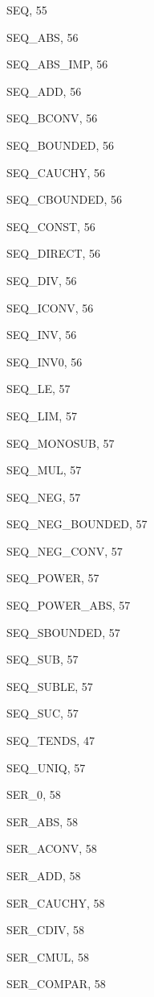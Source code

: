 \begin{theindex}
  \indexspace

  \item {\ptt SEQ}, 55
  \item {\ptt SEQ\_ABS}, 56
  \item {\ptt SEQ\_ABS\_IMP}, 56
  \item {\ptt SEQ\_ADD}, 56
  \item {\ptt SEQ\_BCONV}, 56
  \item {\ptt SEQ\_BOUNDED}, 56
  \item {\ptt SEQ\_CAUCHY}, 56
  \item {\ptt SEQ\_CBOUNDED}, 56
  \item {\ptt SEQ\_CONST}, 56
  \item {\ptt SEQ\_DIRECT}, 56
  \item {\ptt SEQ\_DIV}, 56
  \item {\ptt SEQ\_ICONV}, 56
  \item {\ptt SEQ\_INV}, 56
  \item {\ptt SEQ\_INV0}, 56
  \item {\ptt SEQ\_LE}, 57
  \item {\ptt SEQ\_LIM}, 57
  \item {\ptt SEQ\_MONOSUB}, 57
  \item {\ptt SEQ\_MUL}, 57
  \item {\ptt SEQ\_NEG}, 57
  \item {\ptt SEQ\_NEG\_BOUNDED}, 57
  \item {\ptt SEQ\_NEG\_CONV}, 57
  \item {\ptt SEQ\_POWER}, 57
  \item {\ptt SEQ\_POWER\_ABS}, 57
  \item {\ptt SEQ\_SBOUNDED}, 57
  \item {\ptt SEQ\_SUB}, 57
  \item {\ptt SEQ\_SUBLE}, 57
  \item {\ptt SEQ\_SUC}, 57
  \item {\ptt SEQ\_TENDS}, 47
  \item {\ptt SEQ\_UNIQ}, 57
  \item {\ptt SER\_0}, 58
  \item {\ptt SER\_ABS}, 58
  \item {\ptt SER\_ACONV}, 58
  \item {\ptt SER\_ADD}, 58
  \item {\ptt SER\_CAUCHY}, 58
  \item {\ptt SER\_CDIV}, 58
  \item {\ptt SER\_CMUL}, 58
  \item {\ptt SER\_COMPAR}, 58

\end{theindex}
